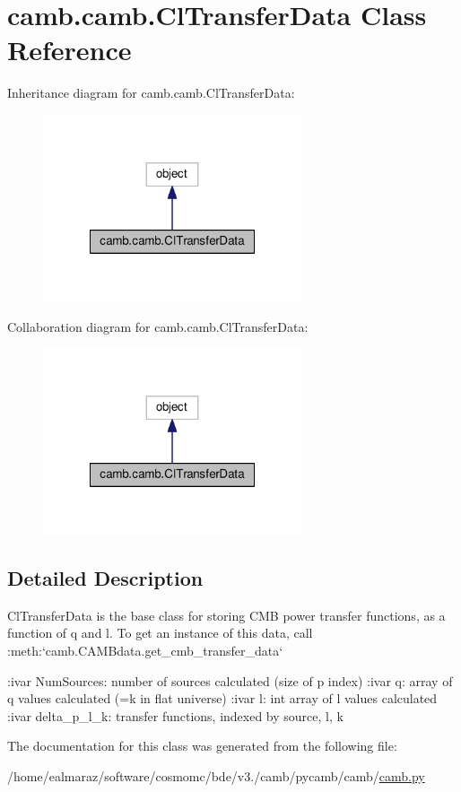 \hypertarget{classcamb_1_1camb_1_1ClTransferData}{}\section{camb.\+camb.\+Cl\+Transfer\+Data Class Reference}
\label{classcamb_1_1camb_1_1ClTransferData}


Inheritance diagram for camb.\+camb.\+Cl\+Transfer\+Data\+:
\nopagebreak
\begin{figure}[H]
\begin{center}
\leavevmode
\includegraphics[width=216pt]{classcamb_1_1camb_1_1ClTransferData__inherit__graph}
\end{center}
\end{figure}


Collaboration diagram for camb.\+camb.\+Cl\+Transfer\+Data\+:
\nopagebreak
\begin{figure}[H]
\begin{center}
\leavevmode
\includegraphics[width=216pt]{classcamb_1_1camb_1_1ClTransferData__coll__graph}
\end{center}
\end{figure}


\subsection{Detailed Description}
\begin{DoxyVerb}ClTransferData is the base class for storing CMB power transfer functions, as a function of q and l.
To get an instance of this data, call :meth:`camb.CAMBdata.get_cmb_transfer_data`

:ivar NumSources:  number of sources calculated (size of p index)
:ivar q: array of q values calculated (=k in flat universe)
:ivar l: int array of l values calculated
:ivar delta_p_l_k: transfer functions, indexed by source, l, k
\end{DoxyVerb}
 

The documentation for this class was generated from the following file\+:\begin{DoxyCompactItemize}
\item 
/home/ealmaraz/software/cosmomc/bde/v3./camb/pycamb/camb/\mbox{\hyperlink{camb_8py}{camb.\+py}}\end{DoxyCompactItemize}
